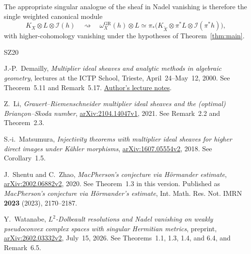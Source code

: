 \documentclass[11pt,a4paper,reqno]{amsart}
\theoremstyle{definition}
\theoremstyle{remark}
\numberwithin{equation}{section}
\newcommand{\II}{\mathcal I}
\newcommand{\GR}{\mathrm{GR}}
\newcommand{\wGR}{\omega_X^{\GR}}
\begin{document}
The appropriate singular analogue of the sheaf in Nadel vanishing is
therefore the single weighted canonical module
\[
 K_X\otimes L\otimes\II(h)
 \quad\rightsquigarrow\quad
 \wGR(h)\otimes L
 \simeq\pi_*\bigl(K_{\widetilde X}\otimes\pi^*L\otimes\II(\pi^*h)\bigr),
\]
with higher-cohomology vanishing under the hypotheses of
Theorem~\ref{thm:main}.

\begin{thebibliography}{SZ20}
\raggedright

J.-P.~Demailly,
\emph{Multiplier ideal sheaves and analytic methods in algebraic geometry},
lectures at the ICTP School, Trieste, April~24--May~12, 2000.
See Theorem~5.11 and Remark~5.17.
\href{https://www-fourier.univ-grenoble-alpes.fr/~demailly/manuscripts/trieste.pdf}
{Author's lecture notes}.

Z.~Li,
\emph{Grauert--Riemenschneider multiplier ideal sheaves and the (optimal)
Brian\c{c}on--Skoda number},
\href{https://arxiv.org/abs/2104.14047v1}{arXiv:2104.14047v1}, 2021.
See Remark~2.2 and Theorem~2.3.

S.-i.~Matsumura,
\emph{Injectivity theorems with multiplier ideal sheaves for higher direct
images under K\"ahler morphisms},
\href{https://arxiv.org/abs/1607.05554v2}{arXiv:1607.05554v2}, 2018.
See Corollary~1.5.

J.~Shentu and C.~Zhao,
\emph{MacPherson's conjecture via H\"ormander estimate},
\href{https://arxiv.org/abs/2002.06882v2}{arXiv:2002.06882v2}, 2020.
See Theorem~1.3 in this version.
Published as \emph{MacPherson's conjecture via H\"ormander's estimate},
Int. Math. Res. Not. IMRN \textbf{2023} (2023), 2170--2187.

Y.~Watanabe,
\emph{$L^2$-Dolbeault resolutions and Nadel vanishing on weakly
pseudoconvex complex spaces with singular Hermitian metrics},
preprint, \href{https://arxiv.org/abs/2602.03332v2}{arXiv:2602.03332v2},
July~15, 2026.
See Theorems~1.1, 1.3, 1.4, and 6.4, and Remark~6.5.

\end{thebibliography}
\end{document}
